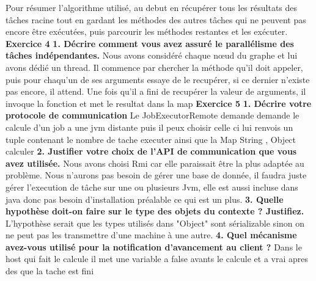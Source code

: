 \documentclass{article}
\begin{document}
Pour résumer l'algorithme utilisé, au debut en récupérer tous les résultats des tâches racine tout en gardant les méthodes 
des autres tâches qui ne peuvent pas encore être exécutées, puis parcourir les méthodes restantes et les exécuter.
\newline
\newline
\textbf{Exercice 4}
\newline
\textbf{1. Décrire comment vous avez assuré le parallélisme des tâches indépendantes.}
\newline
\newline
Nous avons considéré chaque nœud du graphe et lui avons dédié un thread. Il commence par chercher la 
méthode qu'il doit appeler, puis pour chaqu'un de ses arguments essaye de le recupérer, si ce dernier n'existe pas encore, 
il attend. Une fois qu'il a fini de recupérer la valeur de arguments, il invoque la fonction et met le resultat dans la map
\newline
\newline
\textbf{Exercice 5}
\newline
\textbf{1. Décrire votre protocole de communication}
\newline
Le JobExecutorRemote demande demande le calcule d'un job a une jvm distante puis il peux choisir
celle ci lui renvois un tuple contenant le nombre de tache executer ainsi que la Map String , Object  calculer
\newline
\textbf{2. Justifier votre choix de l’API de communication que vous avez utilisée.}
\newline
Nous avons choisi Rmi car elle paraissait être la plus adaptée au problème. Nous n'aurons pas besoin de gérer une base de donnée,
il faudra juste gérer l'execution de tâche sur une ou plusieurs Jvm, elle est aussi incluse dans java donc pas besoin d'installation préalable ce qui est un plus.
\newline
\newline
\textbf{3. Quelle hypothèse doit-on faire sur le type des objets du contexte ? Justifiez.}
\newline
L'hypothèse serait que les types utilisés dans "Object" sont sérializable sinon on ne peut pas les 
transmettre d'une machine à une autre.
\newline
\newline
\textbf{4. Quel mécanisme avez-vous utilisé pour la notification d’avancement au client ?}
\newline
\newline
Dans le host qui fait le calcule il met une variable a false avants le calcule et a vrai apres des que la tache est fini
\end{document}
